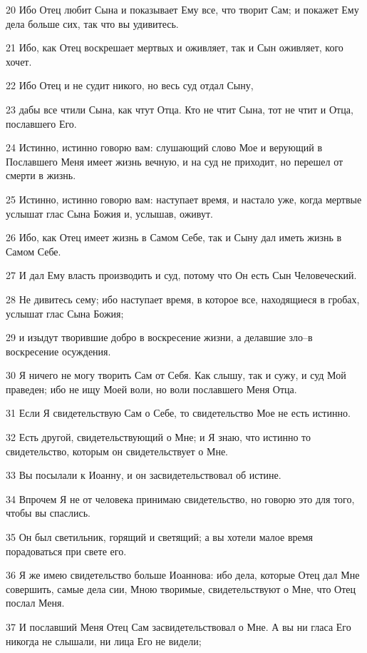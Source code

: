 \par 20 Ибо Отец любит Сына и показывает Ему все, что творит Сам; и покажет Ему дела больше сих, так что вы удивитесь.
\par 21 Ибо, как Отец воскрешает мертвых и оживляет, так и Сын оживляет, кого хочет.
\par 22 Ибо Отец и не судит никого, но весь суд отдал Сыну,
\par 23 дабы все чтили Сына, как чтут Отца. Кто не чтит Сына, тот не чтит и Отца, пославшего Его.
\par 24 Истинно, истинно говорю вам: слушающий слово Мое и верующий в Пославшего Меня имеет жизнь вечную, и на суд не приходит, но перешел от смерти в жизнь.
\par 25 Истинно, истинно говорю вам: наступает время, и настало уже, когда мертвые услышат глас Сына Божия и, услышав, оживут.
\par 26 Ибо, как Отец имеет жизнь в Самом Себе, так и Сыну дал иметь жизнь в Самом Себе.
\par 27 И дал Ему власть производить и суд, потому что Он есть Сын Человеческий.
\par 28 Не дивитесь сему; ибо наступает время, в которое все, находящиеся в гробах, услышат глас Сына Божия;
\par 29 и изыдут творившие добро в воскресение жизни, а делавшие зло--в воскресение осуждения.
\par 30 Я ничего не могу творить Сам от Себя. Как слышу, так и сужу, и суд Мой праведен; ибо не ищу Моей воли, но воли пославшего Меня Отца.
\par 31 Если Я свидетельствую Сам о Себе, то свидетельство Мое не есть истинно.
\par 32 Есть другой, свидетельствующий о Мне; и Я знаю, что истинно то свидетельство, которым он свидетельствует о Мне.
\par 33 Вы посылали к Иоанну, и он засвидетельствовал об истине.
\par 34 Впрочем Я не от человека принимаю свидетельство, но говорю это для того, чтобы вы спаслись.
\par 35 Он был светильник, горящий и светящий; а вы хотели малое время порадоваться при свете его.
\par 36 Я же имею свидетельство больше Иоаннова: ибо дела, которые Отец дал Мне совершить, самые дела сии, Мною творимые, свидетельствуют о Мне, что Отец послал Меня.
\par 37 И пославший Меня Отец Сам засвидетельствовал о Мне. А вы ни гласа Его никогда не слышали, ни лица Его не видели;
